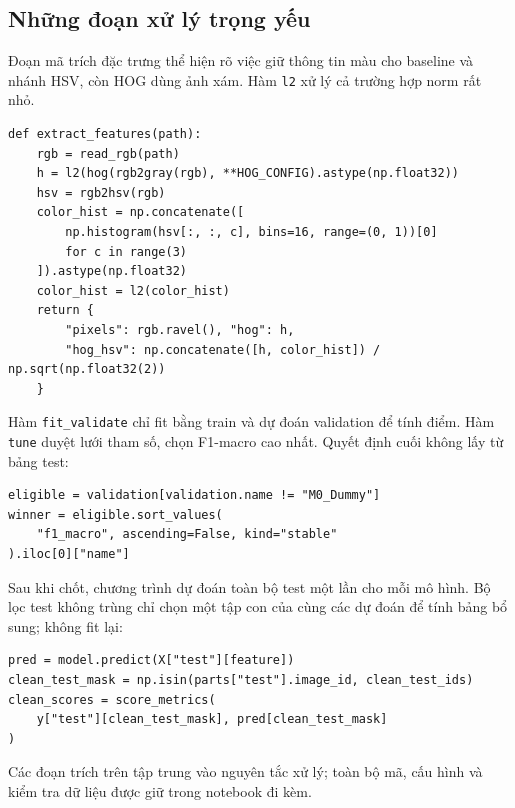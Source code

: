 \subsection{Những đoạn xử lý trọng yếu}
Đoạn mã trích đặc trưng thể hiện rõ việc giữ thông tin màu cho baseline và nhánh HSV, còn HOG dùng ảnh xám. Hàm \texttt{l2} xử lý cả trường hợp norm rất nhỏ.
\par\noindent\begin{minipage}{\linewidth}
\begin{lstlisting}
def extract_features(path):
    rgb = read_rgb(path)
    h = l2(hog(rgb2gray(rgb), **HOG_CONFIG).astype(np.float32))
    hsv = rgb2hsv(rgb)
    color_hist = np.concatenate([
        np.histogram(hsv[:, :, c], bins=16, range=(0, 1))[0]
        for c in range(3)
    ]).astype(np.float32)
    color_hist = l2(color_hist)
    return {
        "pixels": rgb.ravel(), "hog": h,
        "hog_hsv": np.concatenate([h, color_hist]) / np.sqrt(np.float32(2))
    }
\end{lstlisting}
\end{minipage}\par

Hàm \texttt{fit\_validate} chỉ fit bằng train và dự đoán validation để tính điểm. Hàm \texttt{tune} duyệt lưới tham số, chọn F1-macro cao nhất. Quyết định cuối không lấy từ bảng test:
\par\noindent\begin{minipage}{\linewidth}
\begin{lstlisting}
eligible = validation[validation.name != "M0_Dummy"]
winner = eligible.sort_values(
    "f1_macro", ascending=False, kind="stable"
).iloc[0]["name"]
\end{lstlisting}
\end{minipage}\par

Sau khi chốt, chương trình dự đoán toàn bộ test một lần cho mỗi mô hình. Bộ lọc test không trùng chỉ chọn một tập con của cùng các dự đoán để tính bảng bổ sung; không fit lại:
\par\noindent\begin{minipage}{\linewidth}
\begin{lstlisting}
pred = model.predict(X["test"][feature])
clean_test_mask = np.isin(parts["test"].image_id, clean_test_ids)
clean_scores = score_metrics(
    y["test"][clean_test_mask], pred[clean_test_mask]
)
\end{lstlisting}
\end{minipage}\par
Các đoạn trích trên tập trung vào nguyên tắc xử lý; toàn bộ mã, cấu hình và kiểm tra dữ liệu được giữ trong notebook đi kèm.

